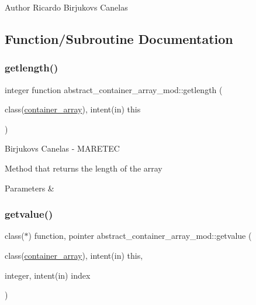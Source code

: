 \begin{DoxyAuthor}{Author}
Ricardo Birjukovs Canelas 
\end{DoxyAuthor}


\subsection{Function/\+Subroutine Documentation}
\mbox{\label{namespaceabstract__container__array__mod_a22d71ca3f03bf0bb5d3737338e5e349a}} 
\subsubsection{\texorpdfstring{getlength()}{getlength()}}
{\footnotesize\ttfamily integer function abstract\+\_\+container\+\_\+array\+\_\+mod\+::getlength (\begin{DoxyParamCaption}\item[{class(\hyperlink{structabstract__container__array__mod_1_1container__array}{container\+\_\+array}), intent(in)}]{this }\end{DoxyParamCaption})\hspace{0.3cm}{\ttfamily [private]}}



Birjukovs Canelas -\/ M\+A\+R\+E\+T\+EC 

Method that returns the length of the array 
\begin{DoxyParams}{Parameters}
{\em } & \\
\hline
\end{DoxyParams}
\mbox{\label{namespaceabstract__container__array__mod_a2b3e0aec504d76c73bf7f18158924af4}} 
\subsubsection{\texorpdfstring{getvalue()}{getvalue()}}
{\footnotesize\ttfamily class($\ast$) function, pointer abstract\+\_\+container\+\_\+array\+\_\+mod\+::getvalue (\begin{DoxyParamCaption}\item[{class(\hyperlink{structabstract__container__array__mod_1_1container__array}{container\+\_\+array}), intent(in)}]{this,  }\item[{integer, intent(in)}]{index }\end{DoxyParamCaption})\hspace{0.3cm}{\ttfamily [private]}}



